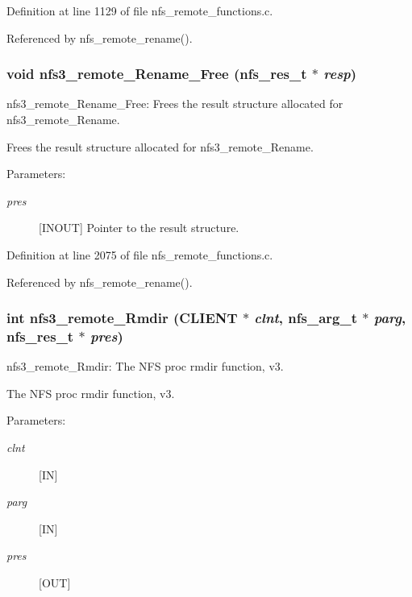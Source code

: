 Definition at line 1129 of file nfs\_\-remote\_\-functions.c.

Referenced by nfs\_\-remote\_\-rename().
\subsubsection{\setlength{\rightskip}{0pt plus 5cm}void nfs3\_\-remote\_\-Rename\_\-Free (nfs\_\-res\_\-t $\ast$ {\em resp})}\label{group__NFSprocs_ga85}


nfs3\_\-remote\_\-Rename\_\-Free: Frees the result structure allocated for nfs3\_\-remote\_\-Rename.

Frees the result structure allocated for nfs3\_\-remote\_\-Rename.

\begin{Desc}
\item[Parameters:]
\begin{description}
\item[{\em pres}][INOUT] Pointer to the result structure. \end{description}
\end{Desc}


Definition at line 2075 of file nfs\_\-remote\_\-functions.c.

Referenced by nfs\_\-remote\_\-rename().
\subsubsection{\setlength{\rightskip}{0pt plus 5cm}int nfs3\_\-remote\_\-Rmdir (CLIENT $\ast$ {\em clnt}, nfs\_\-arg\_\-t $\ast$ {\em parg}, nfs\_\-res\_\-t $\ast$ {\em pres})}\label{group__NFSprocs_ga31}


nfs3\_\-remote\_\-Rmdir: The NFS proc rmdir function, v3.

The NFS proc rmdir function, v3.

\begin{Desc}
\item[Parameters:]
\begin{description}
\item[{\em clnt}][IN] \item[{\em parg}][IN] \item[{\em pres}][OUT] \end{description}
\end{Desc}


